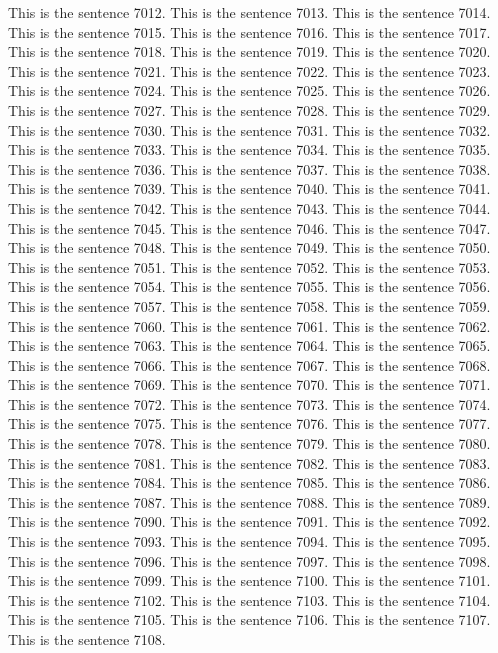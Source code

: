 \documentclass{article}
\begin{document}
This is the sentence 7012.
This is the sentence 7013.
This is the sentence 7014.
This is the sentence 7015.
This is the sentence 7016.
This is the sentence 7017.
This is the sentence 7018.
This is the sentence 7019.
This is the sentence 7020.
This is the sentence 7021.
This is the sentence 7022.
This is the sentence 7023.
This is the sentence 7024.
This is the sentence 7025.
This is the sentence 7026.
This is the sentence 7027.
This is the sentence 7028.
This is the sentence 7029.
This is the sentence 7030.
This is the sentence 7031.
This is the sentence 7032.
This is the sentence 7033.
This is the sentence 7034.
This is the sentence 7035.
This is the sentence 7036.
This is the sentence 7037.
This is the sentence 7038.
This is the sentence 7039.
This is the sentence 7040.
This is the sentence 7041.
This is the sentence 7042.
This is the sentence 7043.
This is the sentence 7044.
This is the sentence 7045.
This is the sentence 7046.
This is the sentence 7047.
This is the sentence 7048.
This is the sentence 7049.
This is the sentence 7050.
This is the sentence 7051.
This is the sentence 7052.
This is the sentence 7053.
This is the sentence 7054.
This is the sentence 7055.
This is the sentence 7056.
This is the sentence 7057.
This is the sentence 7058.
This is the sentence 7059.
This is the sentence 7060.
This is the sentence 7061.
This is the sentence 7062.
This is the sentence 7063.
This is the sentence 7064.
This is the sentence 7065.
This is the sentence 7066.
This is the sentence 7067.
This is the sentence 7068.
This is the sentence 7069.
This is the sentence 7070.
This is the sentence 7071.
This is the sentence 7072.
This is the sentence 7073.
This is the sentence 7074.
This is the sentence 7075.
This is the sentence 7076.
This is the sentence 7077.
This is the sentence 7078.
This is the sentence 7079.
This is the sentence 7080.
This is the sentence 7081.
This is the sentence 7082.
This is the sentence 7083.
This is the sentence 7084.
This is the sentence 7085.
This is the sentence 7086.
This is the sentence 7087.
This is the sentence 7088.
This is the sentence 7089.
This is the sentence 7090.
This is the sentence 7091.
This is the sentence 7092.
This is the sentence 7093.
This is the sentence 7094.
This is the sentence 7095.
This is the sentence 7096.
This is the sentence 7097.
This is the sentence 7098.
This is the sentence 7099.
This is the sentence 7100.
This is the sentence 7101.
This is the sentence 7102.
This is the sentence 7103.
This is the sentence 7104.
This is the sentence 7105.
This is the sentence 7106.
This is the sentence 7107.
This is the sentence 7108.
\end{document}
